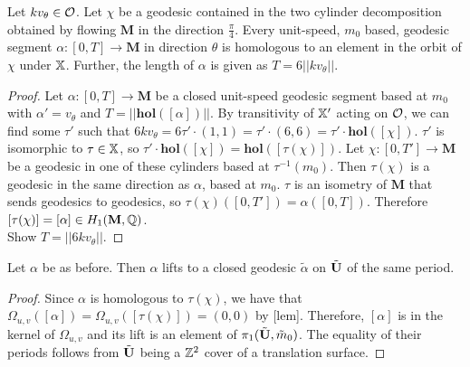 \documentclass[a4paper, 11pt]{article}
\def\hol{\mathbf{hol}}
\def\bM{\mathbf{M}}
\def\mtild{\tilde{m}_0}
\begin{document}
\begin{thm}
Let $kv_\theta\in\mathcal{O}$. Let $\chi$ be a geodesic contained in the two cylinder decomposition obtained by flowing $\bM$ in the direction $\frac{\pi}{4}$. Every unit-speed, $m_0$ based, geodesic segment $\alpha:[0,T]\rightarrow\bM$ in direction $\theta$ is homologous to an element in the orbit of $\chi$ under $\mathbb{X}$. Further, the length of $\alpha$ is given as $T=6||kv_\theta||$.
\begin{proof}
Let $\alpha:[0,T]\rightarrow\bM$ be a closed unit-speed geodesic segment based at $m_0$ with $\alpha'=v_\theta$ and $T=||\hol([\alpha])||$. By transitivity of $\mathbb{X}'$ acting on $\mathcal{O}$, we can find some $\tau'$ such that $6kv_\theta=6\tau'\cdot(1,1)=\tau'\cdot(6,6)=\tau'\cdot\hol([\chi])$. $\tau'$ is isomorphic to $\tau\in\mathbb{X}$, so $\tau'\cdot\hol([\chi])=\hol([\tau(\chi)])$. Let $\chi:[0,T']\rightarrow\bM$ be a geodesic in one of these cylinders based at $\tau^{-1}(m_0)$. Then $\tau(\chi)$ is a geodesic in the same direction as $\alpha$, based at $m_0$. $\tau$ is an isometry of $\bM$ that sends geodesics to geodesics, so $\tau(\chi)([0,T'])=\alpha([0,T])$. Therefore $[\tau(\chi)]=[\alpha]\in H_1(\bM,\QQ)$.\\
Show $T=||6kv_\theta||$.
\end{proof}
\end{thm}

\begin{cor}
Let $\alpha$ be as before. Then $\alpha$ lifts to a closed geodesic $\tilde{\alpha}$ on $\tilde{\mathbf{U}}$ of the same period.
\begin{proof}
Since $\alpha$ is homologous to $\tau(\chi)$, we have that $\Omega_{u,v}([\alpha])=\Omega_{u,v}([\tau(\chi)])=(0,0)$ by [lem]. Therefore, $[\alpha]$ is in the kernel of $\Omega_{u,v}$ and its lift is an element of $\pi_1(\btU,\mtild)$. The equality of their periods follows from $\tilde{\mathbf{U}}$ being a $\mathbb{Z}^2$ cover of a translation surface.
\end{proof}
\end{cor}
\end{document}
